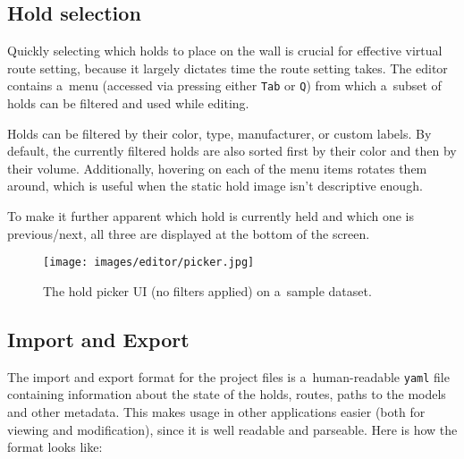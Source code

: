 \subsection{Hold selection}
Quickly selecting which holds to place on the wall is crucial for effective virtual route setting, because it largely dictates time the route setting takes.
The editor contains a~menu (accessed via pressing either \verb|Tab| or \verb|Q|) from which a~subset of holds can be filtered and used while editing.

Holds can be filtered by their color, type, manufacturer, or custom labels.
By default, the currently filtered holds are also sorted first by their color and then by their volume.
Additionally, hovering on each of the menu items rotates them around, which is useful when the static hold image isn't descriptive enough.

To make it further apparent which hold is currently held and which one is previous/next, all three are displayed at the bottom of the screen.

\begin{figure}[h]
	\centering
	\texttt{[image: images/editor/picker.jpg]}%
	\caption{The hold picker UI (no filters applied) on a~sample dataset.}%
	\label{fig:picker}
\end{figure}

\subsection{Import and Export}
The import and export format for the project files is a~human-readable \verb|yaml| file containing information about the state of the holds, routes, paths to the models and other metadata.
This makes usage in other applications easier (both for viewing and modification), since it is well readable and parseable.
Here is how the format looks like:

\newpage

